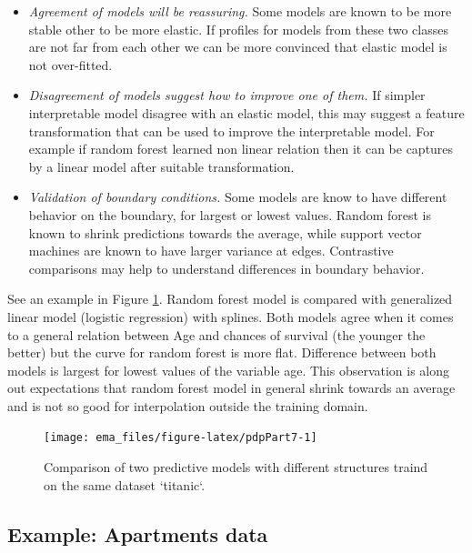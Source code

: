 \documentclass[12pt,]{krantz}
\providecommand{\tightlist}{%
  \setlength{\itemsep}{0pt}\setlength{\parskip}{0pt}}
\begin{document}
\begin{itemize}
\tightlist
\item
  \emph{Agreement of models will be reassuring.} Some models are known to be more stable other to be more elastic. If profiles for models from these two classes are not far from each other we can be more convinced that elastic model is not over-fitted.
\item
  \emph{Disagreement of models suggest how to improve one of them.} If simpler interpretable model disagree with an elastic model, this may suggest a feature transformation that can be used to improve the interpretable model. For example if random forest learned non linear relation then it can be captures by a linear model after suitable transformation.
\item
  \emph{Validation of boundary conditions.} Some models are know to have different behavior on the boundary, for largest or lowest values. Random forest is known to shrink predictions towards the average, while support vector machines are known to have larger variance at edges. Contrastive comparisons may help to understand differences in boundary behavior.
\end{itemize}

See an example in Figure \ref{fig:pdpPart7}. Random forest model is compared with generalized linear model (logistic regression) with splines. Both models agree when it comes to a general relation between Age and chances of survival (the younger the better) but the curve for random forest is more flat. Difference between both models is largest for lowest values of the variable age. This observation is along out expectations that random forest model in general shrink towards an average and is not so good for interpolation outside the training domain.

\begin{figure}

{\centering \texttt{[image: ema\_files/figure-latex/pdpPart7-1]} 

}

\caption{Comparison of two predictive models with different structures traind on the same dataset `titanic`.}\label{fig:pdpPart7}
\end{figure}

\hypertarget{PDPExample}{%
\subsection{Example: Apartments data}\label{PDPExample}}
\end{document}
